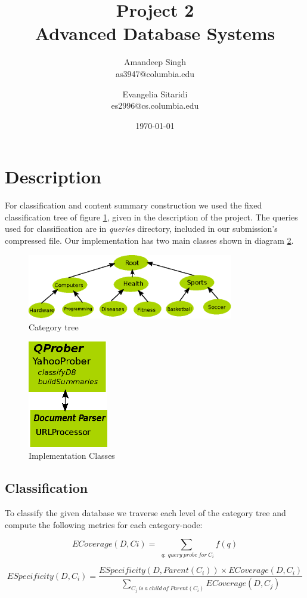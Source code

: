 \documentclass[11pt]{article}
\title{Project 2 \\ Advanced Database Systems \\}
\author{
Amandeep Singh\\as3947@columbia.edu
\and
Evangelia Sitaridi \\ es2996@cs.columbia.edu
}
\date{\today}
\begin{document}
\maketitle

\section{Description}
For classification and content summary construction we used the fixed classification tree of figure \ref{fig:tree}, given in the description of the project. The queries
used for classification are in \textit{queries} directory, included in our submission's compressed file. Our implementation has two main classes shown in diagram \ref{fig:classes}.

\begin{figure}[htb!]
\centering
\includegraphics[width=90mm]{cattree}
\caption{Category tree}
\label{fig:tree}
\end{figure}


\begin{figure}[htb!]
\centering
\includegraphics[width=35mm]{classes}
\caption{Implementation Classes}
\label{fig:classes}
\end{figure}

\subsection{Classification}
To classify the given database we traverse each level of the category tree and compute the following metrics for each category-node:

\[ECoverage(D,Ci)=\sum_{\ \ q: \ query \ probe \ for \ C_i}{f(q)} \]

\[ESpecificity(D, C_i ) = \frac{ESpecificity(D, Parent(C_i )) \times ECoverage(D, C_i )} {\sum_{C_j \ is \ a \ child \ of \ Parent(C_i)} {ECoverage(D,C_j)}} \]
\end{document}
